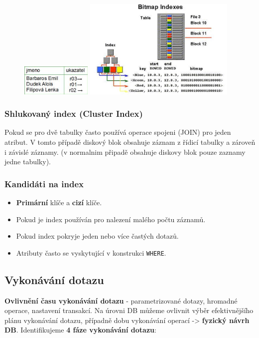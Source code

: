 \begin{figure}[H]
	\centering
	\includegraphics[width=0.3\textwidth]{assets/index_classic.png}
	\includegraphics[width=0.65\textwidth]{assets/index_bitmap.jpg}
\end{figure}

\subsubsection{Shlukovaný index (Cluster Index)}
Pokud se pro dvě tabulky často používá operace spojeni (JOIN) pro jeden atribut. V tomto případě diskový blok obsahuje záznam z řídicí tabulky a zároveň i závislé záznamy. (v normalnim připadě obsahuje diskovy blok pouze zaznamy jedne tabulky).

\subsubsection{Kandidáti na index}
\begin{itemize}
\item \textbf{Primární} klíče a \textbf{cizí} klíče.
\item Pokud je index používán pro nalezení malého počtu záznamů.
\item Pokud index pokryje jeden nebo více častých dotazů.
\item Atributy často se vyskytující v konstrukci \texttt{WHERE}.
\end{itemize}

\subsection{Vykonávání dotazu}
\textbf{Ovlivnění času vykonávání dotazu} - parametrizované dotazy, hromadné operace, nastavení transakcí. Na úrovni DB můžeme ovlivnit výběr efektivnějšího plánu vykonávání dotazu, případně dobu vykonávání operací -> \textbf{fyzický návrh DB}. Identifikujeme \textbf{4 fáze vykonávání dotazu}:

